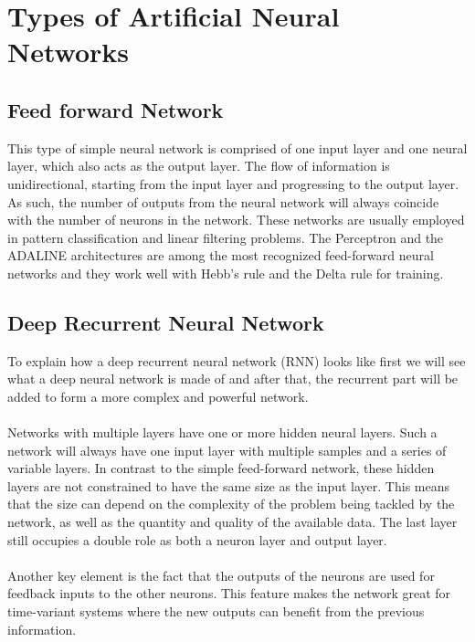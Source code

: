 \section{Types of Artificial Neural Networks}
\subsection{Feed forward Network}
This type of simple neural network is comprised of one input
layer and one neural layer, which also acts as the output layer.
The flow of information is unidirectional, starting from the input layer and progressing to the output layer. As such, the number of outputs from the neural network will always coincide with the number of neurons in the network.
These networks are usually employed in
pattern classification and linear filtering problems. 
The Perceptron and the ADALINE architectures are among the most recognized feed-forward neural networks and they work well with Hebb's rule and the Delta rule for training.

\subsection{Deep Recurrent Neural Network}
To explain how a deep recurrent neural network (RNN) looks like first we will see what a deep neural network is made of and after that, the recurrent part will be added to form a more complex and powerful network.\\\\
Networks with multiple layers have one or more hidden neural layers. Such a network will always have one input layer with multiple samples and a series of variable layers.
In contrast to the simple feed-forward network, these hidden layers are not constrained to have the same size as the input layer. This means
that the size can depend on the complexity of the problem being
tackled by the network, as well as the quantity and quality of the available data. The last layer still occupies a double role as both a neuron layer and output layer.\\\\
Another key element is the fact that the outputs of the neurons are used for feedback inputs to the other neurons.
This feature makes the network great for time-variant systems where the new outputs can benefit from the previous information.

